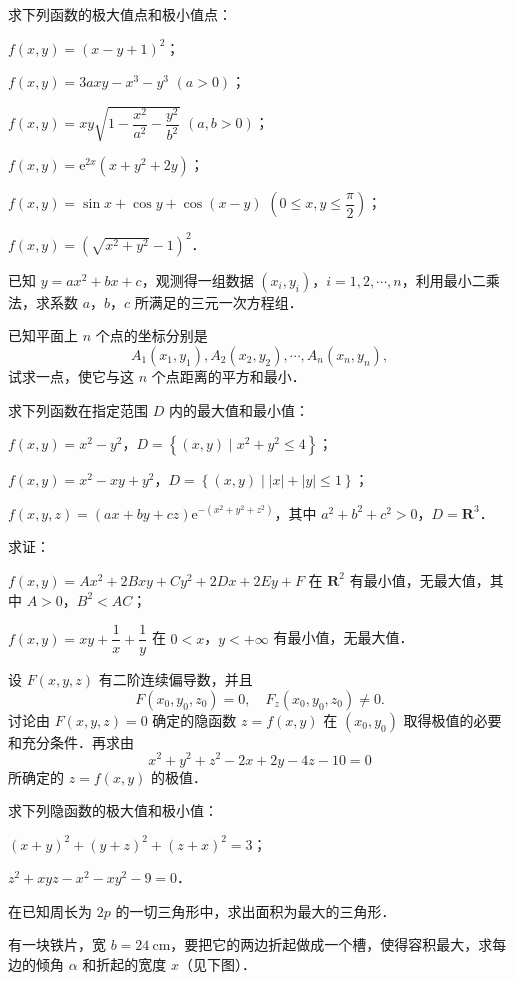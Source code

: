 \begin{xiti}
\item 求下列函数的极大值点和极小值点：
\begin{ziti}
\item $f(x,y)=(x-y+1)^{2}$；
\item $f(x,y)=3axy-x^{3}-y^{3}$ $(a>0)$；
\item $f(x,y)=xy\sqrt{1-\dfrac{x^{2}}{a^{2}}-\dfrac{y^{2}}{b^{2}}}$ $(a,b>0)$；
\item $f(x,y)=\mathrm{e}^{2x}(x+y^{2}+2y)$；
\item $f(x,y)=\sin x+\cos y+\cos(x-y)$ $\left(0\leqslant x,y\leqslant\dfrac{\pi}{2}\right)$；
\item $f(x,y)=\left(\sqrt{x^{2}+y^{2}}-1\right)^{2}$．
\end{ziti}
\item 已知 $y=ax^{2}+bx+c$，观测得一组数据 $(x_{i},y_{i})$，$i=1,2,\cdots,n$，利用最小二乘法，求系数 $a$，$b$，$c$ 所满足的三元一次方程组．
\item 已知平面上 $n$ 个点的坐标分别是
\[
A_{1}(x_{1},y_{1}),A_{2}(x_{2},y_{2}),\cdots,A_{n}(x_{n},y_{n}),
\]
试求一点，使它与这 $n$ 个点距离的平方和最小．
\item 求下列函数在指定范围 $D$ 内的最大值和最小值：
\begin{ziti}
\item $f(x,y)=x^{2}-y^{2}$，$D=\left\{(x,y)\mid x^{2}+y^{2}\leqslant4\right\}$；
\item $f(x,y)=x^{2}-xy+y^{2}$，$D=\left\{(x,y)\mid\left|x\right|+\left|y\right|\leqslant1\right\}$；
\item $f(x,y,z)=(ax+by+cz)\mathrm{e}^{-(x^{2}+y^{2}+z^{2})}$，其中 $a^{2}+b^{2}+c^{2}>0$，$D=\mathbf{R}^{3}$．
\end{ziti}
\item 求证：
\begin{ziti}
\item $f(x,y)=Ax^{2}+2Bxy+Cy^{2}+2Dx+2Ey+F$ 在 $\mathbf{R}^{2}$ 有最小值，无最大值，其中 $A>0$，$B^{2}<AC$；
\item $f(x,y)=xy+\dfrac{1}{x}+\dfrac{1}{y}$ 在 $0<x$，$y<+\infty$ 有最小值，无最大值．
\end{ziti}
\item 设 $F(x,y,z)$ 有二阶连续偏导数，并且
\[
F(x_{0},y_{0},z_{0})=0,\quad F_{z}(x_{0},y_{0},z_{0})\neq0.
\]
讨论由 $F(x,y,z)=0$ 确定的隐函数 $z=f(x,y)$ 在 $(x_{0},y_{0})$ 取得极值的必要和充分条件．再求由
\[
x^{2}+y^{2}+z^{2}-2x+2y-4z-10=0
\]
所确定的 $z=f(x,y)$ 的极值．
\item 求下列隐函数的极大值和极小值：
\begin{ziti}
\item $(x+y)^{2}+(y+z)^{2}+(z+x)^{2}=3$；
\item $z^{2}+xyz-x^{2}-xy^{2}-9=0$．
\end{ziti}
\item 在已知周长为 $2p$ 的一切三角形中，求出面积为最大的三角形．
\item 有一块铁片，宽 $b=24\ \mathrm{cm}$，要把它的两边折起做成一个槽，使得容积最大，求每边的倾角 $\alpha$ 和折起的宽度 $x$（见下图）．


\end{xiti}
